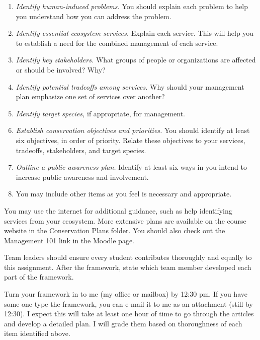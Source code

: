 \documentclass[12pt, hidelinks]{exam}
\begin{document}
\begin{enumerate}[leftmargin=*]

	\item \emph{Identify human-induced problems.} You should explain each problem to help you understand how you can address the problem.
	
	\item \emph{Identify essential ecosystem services.} Explain each service. This will help you to establish a need for the combined management of each service.
	
	\item \emph{Identify key stakeholders.} What groups of people or organizations are affected or should be involved? Why?
	
	\item \emph{Identify potential tradeoffs among services.} Why should your management plan emphasize one set of services over another? 
	
	\item \emph{Identify target species,} if appropriate, for management.

	\item \emph{Establish conservation objectives and priorities.} You should identify at least six objectives, in order of priority. Relate these objectives to your services, tradeoffs, stakeholders, and target species.
	
	\item \emph{Outline a public awareness plan.} Identify at least six ways in you intend to increase public awareness and involvement.
	
	\item You may include other items as you feel is necessary and appropriate.
	
\end{enumerate}

You may use the internet for additional guidance, such as help identifying services from your ecosystem. More extensive plans are available on the course website in the Conservation Plans folder. You should also check out the Management 101 link in the Moodle page.

Team leaders should ensure every student contributes thoroughly and equally to this assignment. After the framework, state which team member developed each part of the framework. 

Turn your framework in to me (my office or mailbox) by 12:30 pm. If you have some one type the framework, you can e-mail it to me as an attachment (still by 12:30). I expect this will take at least one hour of time to go through the articles and develop a detailed plan. I will grade them based on thoroughness of each item identified above.
\end{document}
